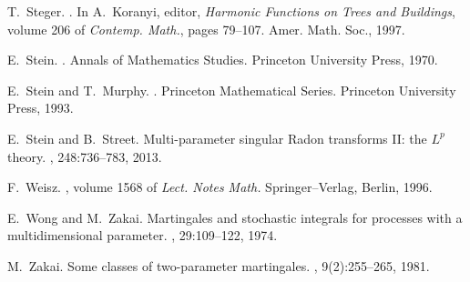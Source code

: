 \documentclass[a4paper]{amsart}
\theoremstyle{plain}
\theoremstyle{definition}
\theoremstyle{remark}
\numberwithin{equation}{section}
\theoremstyle{plain}
\begin{document}
\begin{thebibliography}{10}
T.~Steger.
.
\newblock In A.~Koranyi, editor, {\em Harmonic Functions on Trees and
  Buildings}, volume 206 of {\em Contemp. Math.}, pages 79--107. Amer. Math.
  Soc., 1997.

E.~Stein.
.
\newblock Annals of Mathematics Studies. Princeton University Press, 1970.

E.~Stein and T.~Murphy.
.
\newblock Princeton Mathematical Series. Princeton University Press, 1993.

E.~Stein and B.~Street.
\newblock Multi-parameter singular {R}adon transforms {II}: the {$L^p$} theory.
, 248:736--783, 2013.

F.~Weisz.
, volume 1568 of {\em Lect. Notes Math.}
\newblock Springer--Verlag, Berlin, 1996.

E.~Wong and M.~Zakai.
\newblock Martingales and stochastic integrals for processes with a
  multidimensional parameter.
, 29:109--122, 1974.

M.~Zakai.
\newblock Some classes of two-parameter martingales.
, 9(2):255--265, 1981.

\end{thebibliography}
\end{document}
